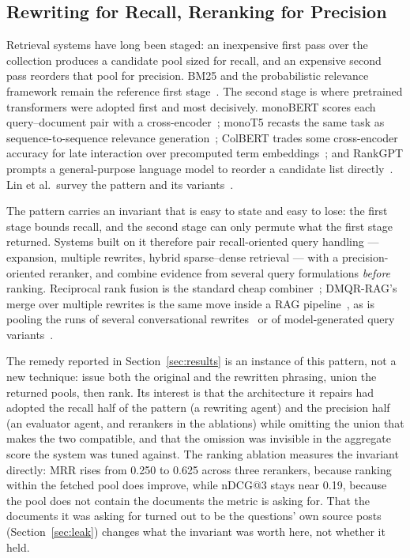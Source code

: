 \documentclass[acmsmall,review,anonymous,screen]{acmart}
\begin{document}
\subsection{Rewriting for Recall, Reranking for Precision}

Retrieval systems have long been staged: an inexpensive first pass over the
collection produces a candidate pool sized for recall, and an expensive second
pass reorders that pool for precision. BM25 and the probabilistic relevance
framework remain the reference first stage~\cite{robertson2009bm25}. The second
stage is where pretrained transformers were adopted first and most decisively.
monoBERT scores each query--document pair with a
cross-encoder~\cite{nogueira2019monobert}; monoT5 recasts the same task as
sequence-to-sequence relevance generation~\cite{nogueira2020monot5}; ColBERT
trades some cross-encoder accuracy for late interaction over precomputed term
embeddings~\cite{khattab2020colbert}; and RankGPT prompts a general-purpose
language model to reorder a candidate list
directly~\cite{sun2023rankgpt}. Lin et al.\ survey the pattern and its
variants~\cite{lin2021pretrained}.

The pattern carries an invariant that is easy to state and easy to lose: the
first stage bounds recall, and the second stage can only permute what the first
stage returned. Systems built on it therefore pair recall-oriented query handling
--- expansion, multiple rewrites, hybrid sparse--dense retrieval --- with a
precision-oriented reranker, and combine evidence from several query formulations
\emph{before} ranking. Reciprocal rank fusion is the standard cheap
combiner~\cite{cormack2009rrf}; DMQR-RAG's merge over multiple rewrites is the
same move inside a RAG pipeline~\cite{gao2024dmqr}, as is pooling the runs of
several conversational rewrites~\cite{kostric2024multiquery} or of
model-generated query variants~\cite{ran2025variants}.

The remedy reported in Section~\ref{sec:results} is an instance of this pattern,
not a new technique: issue both the original and the rewritten phrasing, union
the returned pools, then rank. Its interest is that the architecture it repairs
had adopted the recall half of the pattern (a rewriting agent) and the precision
half (an evaluator agent, and rerankers in the ablations) while omitting the
union that makes the two compatible, and that the omission was invisible in the
aggregate score the system was tuned against. The ranking ablation measures the
invariant directly: MRR rises from 0.250 to 0.625 across three rerankers, because
ranking within the fetched pool does improve, while nDCG@3 stays near 0.19,
because the pool does not contain the documents the metric is asking for. That
the documents it was asking for turned out to be the questions' own source
posts (Section~\ref{sec:leak}) changes what the invariant was worth here, not
whether it held.
\end{document}
